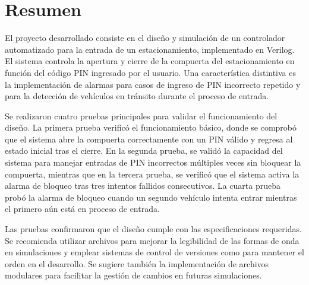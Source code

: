 \section{Resumen}

\hspace{0.35cm} El proyecto desarrollado consiste en el diseño y simulación de un controlador automatizado para la entrada de un estacionamiento, implementado en Verilog. 
El sistema controla la apertura y cierre de la compuerta del estacionamiento en función del código PIN ingresado por el usuario. 
Una característica distintiva es la implementación de alarmas para casos de ingreso de PIN incorrecto repetido y para la detección de vehículos en tránsito durante el proceso de entrada.

\vspace{0.15cm}

\hspace{0.35cm} Se realizaron cuatro pruebas principales para validar el funcionamiento del diseño.
La primera prueba verificó el funcionamiento básico, donde se comprobó que el sistema abre la compuerta correctamente con un PIN válido y regresa al estado inicial tras el cierre. 
En la segunda prueba, se validó la capacidad del sistema para manejar entradas de PIN incorrectos múltiples veces sin bloquear la compuerta, mientras que en la tercera prueba, se verificó que el sistema activa la alarma de bloqueo tras tres intentos fallidos consecutivos.
La cuarta prueba probó la alarma de bloqueo cuando un segundo vehículo intenta entrar mientras el primero aún está en proceso de entrada.


\vspace{0.15cm}

\hspace{0.35cm} Las pruebas confirmaron que el diseño cumple con las especificaciones requeridas. Se recomienda utilizar archivos  para mejorar la legibilidad de las formas de onda en simulaciones y emplear sistemas de control de versiones como  para mantener el orden en el desarrollo. 
Se sugiere también la implementación de archivos  modulares para facilitar la gestión de cambios en futuras simulaciones.

